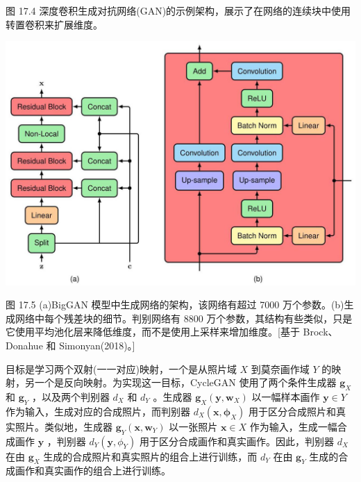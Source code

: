 \documentclass[10pt]{article}
\begin{document}
图 17.4 深度卷积生成对抗网络(GAN)的示例架构，展示了在网络的连续块中使用转置卷积来扩展维度。

\begin{center}
\includegraphics[max width=1.0\textwidth]{images/0194e279-9b28-703a-88f4-c3ac21e2010d_559_226_346_1280_893_0.jpg}
\end{center}
\hspace*{3em} 

图 17.5 (a)BigGAN 模型中生成网络的架构，该网络有超过 7000 万个参数。(b)生成网络中每个残差块的细节。判别网络有 8800 万个参数，其结构有些类似，只是它使用平均池化层来降低维度，而不是使用上采样来增加维度。[基于 Brock、Donahue 和 Simonyan(2018)。]

目标是学习两个双射(一一对应)映射，一个是从照片域 \(X\) 到莫奈画作域 \(Y\) 的映射，另一个是反向映射。为实现这一目标，CycleGAN 使用了两个条件生成器 \({\mathbf{g}}_{X}\) 和 \({\mathbf{g}}_{Y}\) ，以及两个判别器 \({d}_{X}\) 和 \({d}_{Y}\) 。生成器 \({\mathbf{g}}_{X}\left( {\mathbf{y},{\mathbf{w}}_{X}}\right)\) 以一幅样本画作 \(\mathbf{y} \in  Y\) 作为输入，生成对应的合成照片，而判别器 \({d}_{X}\left( {\mathbf{x},{\mathbf{\phi }}_{X}}\right)\) 用于区分合成照片和真实照片。类似地，生成器 \({\mathbf{g}}_{Y}\left( {\mathbf{x},{\mathbf{w}}_{Y}}\right)\) 以一张照片 \(\mathbf{x} \in  X\) 作为输入，生成一幅合成画作 \(\mathbf{y}\) ，判别器 \({d}_{Y}\left( {\mathbf{y},{\phi }_{Y}}\right)\) 用于区分合成画作和真实画作。因此，判别器 \({d}_{X}\) 在由 \({\mathbf{g}}_{X}\) 生成的合成照片和真实照片的组合上进行训练，而 \({d}_{Y}\) 在由 \({\mathbf{g}}_{Y}\) 生成的合成画作和真实画作的组合上进行训练。
\end{document}
